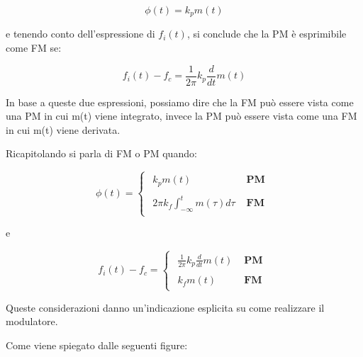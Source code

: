 {
    \Large 
    \begin{equation}
        \phi (t) = k_p m(t)
    \end{equation}
}

e tenendo conto dell'espressione di $f_i (t)$, 
si conclude che la PM è esprimibile come FM se: 

{
    \Large 
    \begin{equation}
        f_i (t) - f_c 
        =
        \frac{1}{2 \pi} k_p \frac{d}{dt} m(t)
    \end{equation}
}

In base a queste due espressioni, possiamo dire che la FM può essere vista come una PM in cui m(t) viene integrato, 
invece la PM può essere vista come una FM in cui m(t) viene derivata. \newline 

Ricapitolando si parla di FM o PM quando: 

{
    \Large 
    \begin{equation}
        \phi (t)
        = 
        \begin{cases}
            \begin{array}{ll}
            k_p m(t) & \textbf{ PM} 
            \\
            \\
            2 \pi k_f \int_{-\infty}^{t} m(\tau) d\tau & \textbf{ FM}
            \end{array} 
        \end{cases}
    \end{equation}
}

e 

{
    \Large 
    \begin{equation}
        f_i (t) - f_c
        = 
        \begin{cases}
            \begin{array}{ll}
            \frac{1}{2 \pi} k_p \frac{d}{dt} m(t) & \textbf{ PM} 
            \\
            \\
            k_f m(t) & \textbf{ FM}
            \end{array} 
        \end{cases}
    \end{equation}
}

Queste considerazioni danno un'indicazione esplicita su come realizzare il modulatore. \newline 

\newpage 

Come viene spiegato dalle seguenti figure: 

